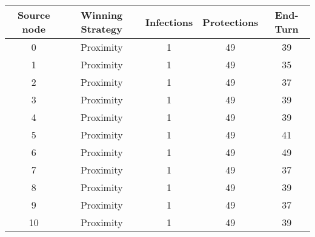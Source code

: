 \documentclass[results.tex]{subfiles}
\begin{document}
    \begin{center}
        \begin{tabular}{| c || c | c | c | c |}
            \hline
            {\bfseries Source node} & {\bfseries Winning Strategy} & {\bfseries Infections} & {\bfseries Protections}
            & {\bfseries End-Turn}
            \\  %
            \hline\hline
            0                       & Proximity                    & 1                      & 49                      & 39                   \\
            \hline
            1                       & Proximity                    & 1                      & 49                      & 35                   \\
            \hline
            2                       & Proximity                    & 1                      & 49                      & 37                   \\
            \hline
            3                       & Proximity                    & 1                      & 49                      & 39                   \\
            \hline
            4                       & Proximity                    & 1                      & 49                      & 39                   \\
            \hline
            5                       & Proximity                    & 1                      & 49                      & 41                   \\
            \hline
            6                       & Proximity                    & 1                      & 49                      & 49                   \\
            \hline
            7                       & Proximity                    & 1                      & 49                      & 37                   \\
            \hline
            8                       & Proximity                    & 1                      & 49                      & 39                   \\
            \hline
            9                       & Proximity                    & 1                      & 49                      & 37                   \\
            \hline
            10                      & Proximity                    & 1                      & 49                      & 39                   \\

\end{tabular}
\end{center}
\end{document}
